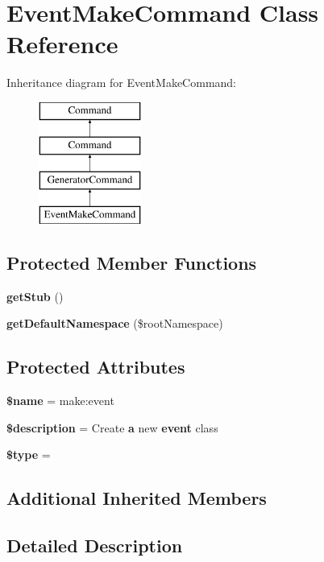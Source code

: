 \section{Event\+Make\+Command Class Reference}
\label{class_illuminate_1_1_foundation_1_1_console_1_1_event_make_command}
Inheritance diagram for Event\+Make\+Command\+:\begin{figure}[H]
\begin{center}
\leavevmode
\includegraphics[height=4.000000cm]{class_illuminate_1_1_foundation_1_1_console_1_1_event_make_command}
\end{center}
\end{figure}
\subsection*{Protected Member Functions}
\begin{DoxyCompactItemize}
\item 
{\bf get\+Stub} ()
\item 
{\bf get\+Default\+Namespace} (\$root\+Namespace)
\end{DoxyCompactItemize}
\subsection*{Protected Attributes}
\begin{DoxyCompactItemize}
\item 
{\bf \$name} = \textquotesingle{}make\+:event\textquotesingle{}
\item 
{\bf \$description} = \textquotesingle{}Create {\bf a} new {\bf event} class\textquotesingle{}
\item 
{\bf \$type} = \textquotesingle{}
\end{DoxyCompactItemize}
\subsection*{Additional Inherited Members}


\subsection{Detailed Description}


